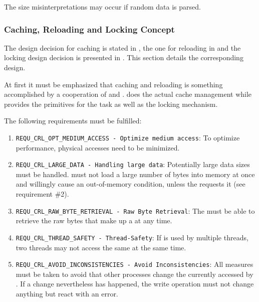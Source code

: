 The size misinterpretations may occur if random data is parsed.



\subsubsection{Caching, Reloading and Locking Concept}
\label{sec:CachingReloadingConcept}

\newcommand{\REQUcrlOptMediumAccess}{\texttt{REQU\_CRL\_OPT\_MEDIUM\_ACCESS - Optimize medium access}}
\newcommand{\REQUcrlLargeData}{\texttt{REQU\_CRL\_LARGE\_DATA - Handling large data}}
\newcommand{\REQUcrlRawByteRetrieval}{\texttt{REQU\_CRL\_RAW\_BYTE\_RETRIEVAL - Raw Byte Retrieval}}
\newcommand{\REQUcrlThreadSafety}{\texttt{REQU\_CRL\_THREAD\_SAFETY - Thread-Safety}}
\newcommand{\REQUcrlAvoidInconsistencies}{\texttt{REQU\_CRL\_AVOID\_INCONSISTENCIES - Avoid Inconsistencies}}

The design decision for caching is stated in , the one for reloading in  and the locking design decision is presented in . This section details the corresponding design.

At first it must be emphasized that caching and reloading is something accomplished by a cooperation of \COMPmedia{} and \COMPdataBlocks{}. \COMPdataBlocks{} does the actual cache management while \COMPmedia{} provides the primitives for the task as well as the locking mechanism.

The following requirements must be fulfilled:
\begin{enumerate}
	\item \REQUcrlOptMediumAccess{}: To optimize performance, physical \TERMmedium{} accesses need to be minimized.
	\item \REQUcrlLargeData{}: Potentially large data sizes must be handled. \LibName{} must not load a large number of bytes into memory at once and willingly cause an out-of-memory condition, unless the \ACTORuser{} requests it (see requirement \#2).
	\item \REQUcrlRawByteRetrieval{}: The \ACTORuser{} must be able to retrieve the raw bytes that make up a \TERMdataBlock{} at any time.
	\item \REQUcrlThreadSafety{}: If \LibName{} is used by multiple threads, two threads may not access the same \TERMmedium{} at the same time.
	\item \REQUcrlAvoidInconsistencies{}: All measures must be taken to avoid that other processes change the \TERMmedium{} currently accessed by \LibName{}. If a change nevertheless has happened, the write operation must not change anything but react with an error.
\end{enumerate}

